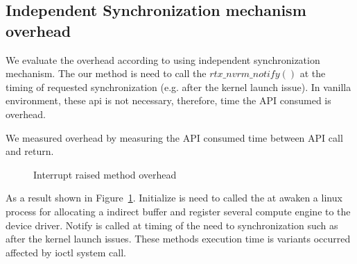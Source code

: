 \subsection{Independent Synchronization mechanism overhead}
We evaluate the overhead according to using independent synchronization mechanism.
The our method is need to call the $rtx\_nvrm\_notify()$ at the timing of requested synchronization (e.g. after the kernel launch issue). 
In vanilla environment, these api is not necessary, therefore, time the API consumed is overhead.

We measured overhead by measuring the API consumed time between API call and return.

\begin{figure}[!t]
\begin{center}
\caption{Interrupt raised method overhead}
\label{fig:irq_rise_overhead}
\end{center}
\end{figure}

As a result shown in Figure~\ref{fig:irq_rise_overhead}.
Initialize is need to called the at awaken a linux process for allocating a indirect buffer and register several compute engine to the device driver.
Notify is called at timing of the need to synchronization such as after the kernel launch issues.
These methods execution time is variants occurred affected by ioctl system call.

